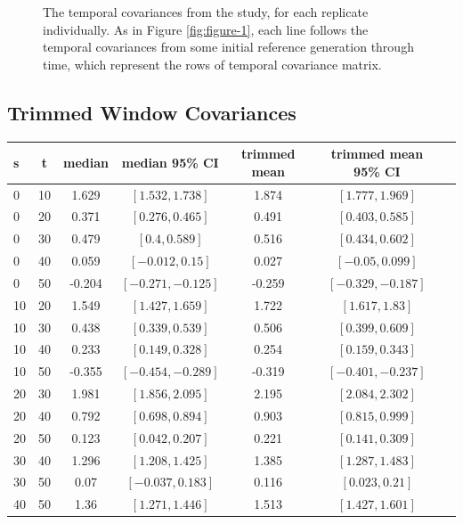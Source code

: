 \documentclass[11pt]{article}
\begin{document}
{\begin{figure}[!ht]
  \caption{The temporal covariances from the \textcite{Barghi2019-qy} study,
  for each replicate individually. As in Figure \ref{fig:figure-1}, each line
  follows the temporal covariances from some initial reference generation through
  time, which represent the rows of temporal covariance matrix.}

  \label{suppfig:barghi-cov-panels}
\end{figure}


\clearpage

\subsection{\textcite{Barghi2019-qy} Trimmed Window Covariances}
\begin{table}
  \centering
  \footnotesize
  \centering
  \begin{tabular}{l c c c c c c}

    s & t & median & median 95\% CI & trimmed mean & trimmed mean 95\% CI \\ \hline
    0 & 10 & 1.629 & $[1.532, 1.738]$ & 1.874 & $[1.777, 1.969]$ \\
    0 & 20 & 0.371 & $[0.276, 0.465]$ & 0.491 & $[0.403, 0.585]$ \\
    0 & 30 & 0.479 & $[0.4, 0.589]$ & 0.516 & $[0.434, 0.602]$ \\
    0 & 40 & 0.059 & $[-0.012, 0.15]$ & 0.027 & $[-0.05, 0.099]$ \\
    0 & 50 & -0.204 & $[-0.271, -0.125]$ & -0.259 & $[-0.329, -0.187]$ \\
    10 & 20 & 1.549 & $[1.427, 1.659]$ & 1.722 & $[1.617, 1.83]$ \\
    10 & 30 & 0.438 & $[0.339, 0.539]$ & 0.506 & $[0.399, 0.609]$ \\
    10 & 40 & 0.233 & $[0.149, 0.328]$ & 0.254 & $[0.159, 0.343]$ \\
    10 & 50 & -0.355 & $[-0.454, -0.289]$ & -0.319 & $[-0.401, -0.237]$ \\
    20 & 30 & 1.981 & $[1.856, 2.095]$ & 2.195 & $[2.084, 2.302]$ \\
    20 & 40 & 0.792 & $[0.698, 0.894]$ & 0.903 & $[0.815, 0.999]$ \\
    20 & 50 & 0.123 & $[0.042, 0.207]$ & 0.221 & $[0.141, 0.309]$ \\
    30 & 40 & 1.296 & $[1.208, 1.425]$ & 1.385 & $[1.287, 1.483]$ \\
    30 & 50 & 0.07 & $[-0.037, 0.183]$ & 0.116 & $[0.023, 0.21]$ \\
    40 & 50 & 1.36 & $[1.271, 1.446]$ & 1.513 & $[1.427, 1.601]$ \\



\end{tabular}
\end{table}}
\end{document}
